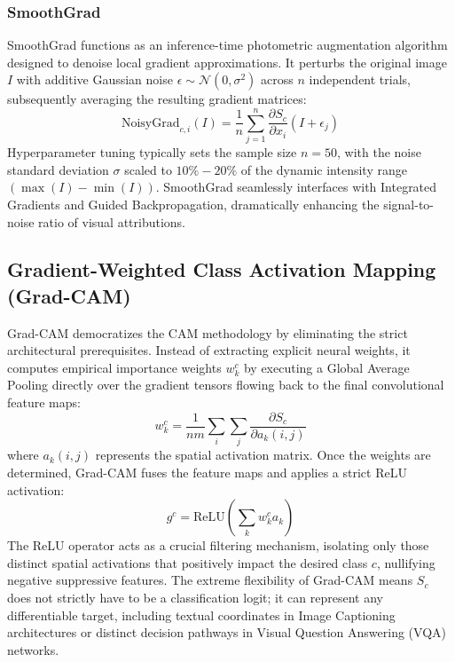 \subsubsection{SmoothGrad}
SmoothGrad functions as an inference-time photometric augmentation algorithm designed to denoise local gradient approximations. It perturbs the original image $I$ with additive Gaussian noise $\epsilon \sim \mathcal{N}(0, \sigma^2)$ across $n$ independent trials, subsequently averaging the resulting gradient matrices:
\begin{equation}
\text{NoisyGrad}_{c,i}(I) = \frac{1}{n} \sum_{j=1}^n \frac{\partial S_c}{\partial x_i}(I + \epsilon_j)
\end{equation}
Hyperparameter tuning typically sets the sample size $n=50$, with the noise standard deviation $\sigma$ scaled to $10\% - 20\%$ of the dynamic intensity range $(\max(I) - \min(I))$. SmoothGrad seamlessly interfaces with Integrated Gradients and Guided Backpropagation, dramatically enhancing the signal-to-noise ratio of visual attributions.

\subsection{Gradient-Weighted Class Activation Mapping (Grad-CAM)}

Grad-CAM democratizes the CAM methodology by eliminating the strict architectural prerequisites. Instead of extracting explicit neural weights, it computes empirical importance weights $w_k^c$ by executing a Global Average Pooling directly over the gradient tensors flowing back to the final convolutional feature maps:
\begin{equation}
w_k^c = \frac{1}{nm} \sum_i \sum_j \frac{\partial S_c}{\partial a_k(i, j)}
\end{equation}
where $a_k(i, j)$ represents the spatial activation matrix. Once the weights are determined, Grad-CAM fuses the feature maps and applies a strict ReLU activation:
\begin{equation}
g^c = \text{ReLU}\left(\sum_k w_k^c a_k\right)
\end{equation}
The ReLU operator acts as a crucial filtering mechanism, isolating only those distinct spatial activations that positively impact the desired class $c$, nullifying negative suppressive features. The extreme flexibility of Grad-CAM means $S_c$ does not strictly have to be a classification logit; it can represent any differentiable target, including textual coordinates in Image Captioning architectures or distinct decision pathways in Visual Question Answering (VQA) networks.

